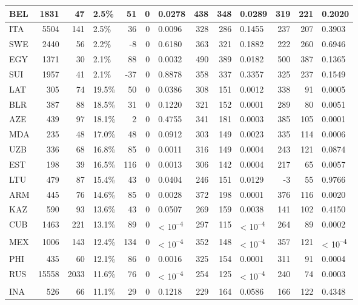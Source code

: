 \begin{tabular}{l|r|r|l|r|r|l|r|r|l|r|r|l}
\hline
BEL & 1831 & 47 & 2.5\% & 51 & 0 & 0.0278 & 438 & 348 & 0.0289 & 319 & 221 & 0.2020\\
\hline
ITA & 5504 & 141 & 2.5\% & 36 & 0 & 0.0096 & 328 & 286 & 0.1455 & 237 & 207 & 0.3903\\
\hline
SWE & 2440 & 56 & 2.2\% & -8 & 0 & 0.6180 & 363 & 321 & 0.1882 & 222 & 260 & 0.6946\\
\hline
EGY & 1371 & 30 & 2.1\% & 88 & 0 & 0.0032 & 490 & 389 & 0.0182 & 500 & 387 & 0.1365\\
\hline
SUI & 1957 & 41 & 2.1\% & -37 & 0 & 0.8878 & 358 & 337 & 0.3357 & 325 & 237 & 0.1549\\
\hline
LAT & 305 & 74 & 19.5\% & 50 & 0 & 0.0386 & 308 & 151 & 0.0012 & 338 & 91 & 0.0005\\
\hline
BLR & 387 & 88 & 18.5\% & 31 & 0 & 0.1220 & 321 & 152 & 0.0001 & 289 & 80 & 0.0051\\
\hline
AZE & 439 & 97 & 18.1\% & 2 & 0 & 0.4755 & 341 & 181 & 0.0003 & 385 & 105 & 0.0001\\
\hline
MDA & 235 & 48 & 17.0\% & 48 & 0 & 0.0912 & 303 & 149 & 0.0023 & 335 & 114 & 0.0006\\
\hline
UZB & 336 & 68 & 16.8\% & 85 & 0 & 0.0011 & 316 & 149 & 0.0004 & 243 & 121 & 0.0874\\
\hline
EST & 198 & 39 & 16.5\% & 116 & 0 & 0.0013 & 306 & 142 & 0.0004 & 217 & 65 & 0.0057\\
\hline
LTU & 479 & 87 & 15.4\% & 43 & 0 & 0.0404 & 246 & 151 & 0.0129 & -3 & 55 & 0.9766\\
\hline
ARM & 445 & 76 & 14.6\% & 85 & 0 & 0.0028 & 372 & 198 & 0.0001 & 376 & 116 & 0.0020\\
\hline
KAZ & 590 & 93 & 13.6\% & 43 & 0 & 0.0507 & 269 & 159 & 0.0038 & 141 & 102 & 0.4150\\
\hline
CUB & 1463 & 221 & 13.1\% & 89 & 0 & < 10\textsuperscript{--4} & 297 & 115 & < 10\textsuperscript{--4} & 264 & 89 & 0.0002\\
\hline
MEX & 1006 & 143 & 12.4\% & 134 & 0 & < 10\textsuperscript{--4} & 352 & 148 & < 10\textsuperscript{--4} & 357 & 121 & < 10\textsuperscript{--4}\\
\hline
PHI & 435 & 60 & 12.1\% & 86 & 0 & 0.0016 & 325 & 154 & 0.0001 & 311 & 91 & 0.0004\\
\hline
RUS & 15558 & 2033 & 11.6\% & 76 & 0 & < 10\textsuperscript{--4} & 254 & 125 & < 10\textsuperscript{--4} & 240 & 74 & 0.0003\\
\hline
INA & 526 & 66 & 11.1\% & 29 & 0 & 0.1218 & 229 & 164 & 0.0586 & 166 & 122 & 0.4348\\

\end{tabular}
